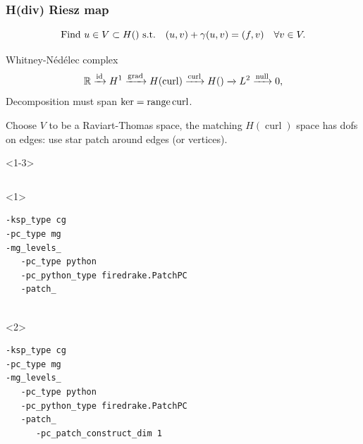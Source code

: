 \documentclass[presentation,aspectratio=43, 10pt]{beamer}
\DeclareMathOperator{\grad}{grad}
\let\div\relax
\DeclareMathOperator{\div}{div}
\DeclareMathOperator{\curl}{curl}
\DeclareMathOperator{\range}{range}
\begin{document}
\begin{frame}[fragile, t]
  \frametitle{H(div) Riesz map}
  \vspace{-1.5\baselineskip}
  \begin{equation*}
    \text{Find $u \in V \subset H(\div)$ s.t.}\quad (u, v) + \gamma (\div u, \div v) = (f, v) \quad \forall v \in V.
  \end{equation*}
  \vspace*{-\baselineskip}
  \begin{block}{Whitney-N\'ed\'elec complex}
    \begin{equation*}
      \mathbb{R} \xrightarrow{\operatorname{id}} H^1 \xrightarrow{\grad} H(\curl)
      \xrightarrow{\curl} H(\div) \xrightarrow{\div} L^2 \xrightarrow{\operatorname{null}} 0,
    \end{equation*}
    Decomposition must span $\ker \div = \range \curl$.

    Choose $V$ to be a Raviart-Thomas space, the matching $H(\curl)$
    space has dofs on edges: use star patch around edges (or vertices).
  \end{block}
  \begin{onlyenv}<1-3>
    \begin{columns}[T]
      \begin{column}{0.6\textwidth}
        \begin{onlyenv}<1>
\begin{verbatim}
-ksp_type cg
-pc_type mg
-mg_levels_
   -pc_type python
   -pc_python_type firedrake.PatchPC
   -patch_


\end{verbatim}
        \end{onlyenv}
        \begin{onlyenv}<2>
\begin{verbatim}
-ksp_type cg
-pc_type mg
-mg_levels_
   -pc_type python
   -pc_python_type firedrake.PatchPC
   -patch_
      -pc_patch_construct_dim 1


\end{verbatim}
\end{onlyenv}
\end{column}
\end{columns}
\end{onlyenv}
\end{frame}
\end{document}
